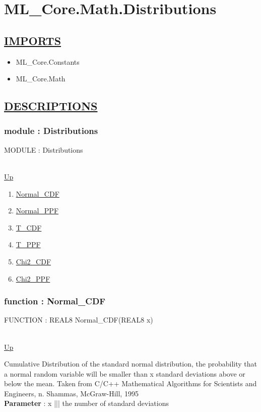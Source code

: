 \chapter*{ML\_Core.Math.Distributions}
\hypertarget{ML_Core.Math.Distributions}{}

\section*{\underline{IMPORTS}}
\begin{itemize}
\item ML\_Core.Constants
\item ML\_Core.Math
\end{itemize}

\section*{\underline{DESCRIPTIONS}}
\subsection*{module : Distributions}
\hypertarget{ecldoc:ML_Core.Math.Distributions}{MODULE : Distributions} \\
\hyperlink{ecldoc:}{Up} \\
\par
\begin{enumerate}
\item \hyperlink{ecldoc:ml_core.math.distributions.normal_cdf}{Normal\_CDF}
\item \hyperlink{ecldoc:ml_core.math.distributions.normal_ppf}{Normal\_PPF}
\item \hyperlink{ecldoc:ml_core.math.distributions.t_cdf}{T\_CDF}
\item \hyperlink{ecldoc:ml_core.math.distributions.t_ppf}{T\_PPF}
\item \hyperlink{ecldoc:ml_core.math.distributions.chi2_cdf}{Chi2\_CDF}
\item \hyperlink{ecldoc:ml_core.math.distributions.chi2_ppf}{Chi2\_PPF}
\end{enumerate}
\subsection*{function : Normal\_CDF}
\hypertarget{ecldoc:ml_core.math.distributions.normal_cdf}{FUNCTION : REAL8 Normal\_CDF(REAL8 x)} \\
\hyperlink{ecldoc:ML_Core.Math.Distributions}{Up} \\
\par
Cumulative Distribution of the standard normal distribution, the probability that a normal random variable will be smaller than x standard deviations above or below the mean. Taken from C/C++ Mathematical Algorithms for Scientists and Engineers, n. Shammas, McGraw-Hill, 1995 \\
\textbf{Parameter} : x ||| the number of standard deviations \\
